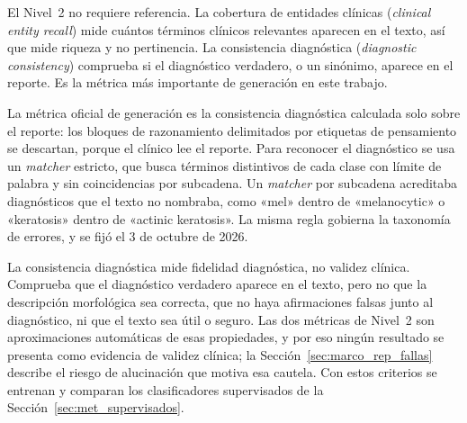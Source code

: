 El Nivel~2 no requiere referencia. La cobertura de entidades clínicas (\emph{clinical entity recall}) mide cuántos
términos clínicos relevantes aparecen en el texto, así que mide riqueza y no pertinencia. La consistencia diagnóstica
(\emph{diagnostic consistency}) comprueba si el diagnóstico verdadero, o un sinónimo, aparece en el reporte. Es la
métrica más importante de generación en este trabajo.

La métrica oficial de generación es la consistencia diagnóstica calculada solo sobre el reporte: los bloques de
razonamiento delimitados por etiquetas de pensamiento se descartan, porque el clínico lee el reporte. Para reconocer
el diagnóstico se usa un \emph{matcher} estricto, que busca términos distintivos de cada clase con límite de palabra
y sin coincidencias por subcadena. Un \emph{matcher} por subcadena acreditaba diagnósticos que el texto no nombraba,
como «mel» dentro de «melanocytic» o «keratosis» dentro de «actinic keratosis». La misma regla gobierna la taxonomía
de errores, y se fijó el 3 de octubre de 2026.

La consistencia diagnóstica mide fidelidad diagnóstica, no validez clínica. Comprueba que el diagnóstico verdadero
aparece en el texto, pero no que la descripción morfológica sea correcta, que no haya afirmaciones falsas junto al
diagnóstico, ni que el texto sea útil o seguro. Las dos métricas de Nivel~2 son aproximaciones automáticas de esas
propiedades, y por eso ningún resultado se presenta como evidencia de validez clínica; la Sección~\ref{sec:marco_rep_fallas}
describe el riesgo de alucinación que motiva esa cautela. Con estos criterios se entrenan y comparan los clasificadores
supervisados de la Sección~\ref{sec:met_supervisados}.

